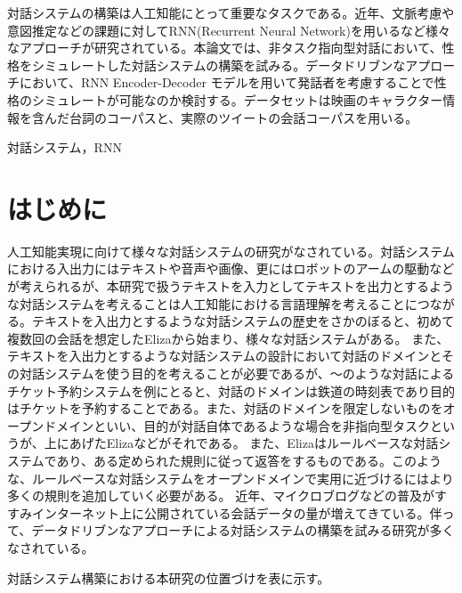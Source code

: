 \documentclass{deimj}
\begin{document}
\pagestyle{empty}
\begin{jabstract}
対話システムの構築は人工知能にとって重要なタスクである。近年、文脈考慮や意図推定などの課題に対してRNN(Recurrent Neural Network)を用いるなど様々なアプローチが研究されている。本論文では、非タスク指向型対話において、性格をシミュレートした対話システムの構築を試みる。データドリブンなアプローチにおいて、RNN Encoder-Decoder モデルを用いて発話者を考慮することで性格のシミュレートが可能なのか検討する。データセットは映画のキャラクター情報を含んだ台詞のコーパスと、実際のツイートの会話コーパスを用いる。
\end{jabstract}

\begin{jkeyword}
対話システム，RNN
\end{jkeyword}
\maketitle

\section{はじめに}
\label{sec:introduction}

人工知能実現に向けて様々な対話システムの研究がなされている。対話システムにおける入出力にはテキストや音声や画像、更にはロボットのアームの駆動などが考えられるが、本研究で扱うテキストを入力としてテキストを出力とするような対話システムを考えることは人工知能における言語理解を考えることにつながる。テキストを入出力とするような対話システムの歴史をさかのぼると、初めて複数回の会話を想定したElizaから始まり、様々な対話システムがある。%
また、テキストを入出力とするような対話システムの設計において対話のドメインとその対話システムを使う目的を考えることが必要であるが、〜のような対話によるチケット予約システムを例にとると、対話のドメインは鉄道の時刻表であり目的はチケットを予約することである。また、対話のドメインを限定しないものをオープンドメインといい、目的が対話自体であるような場合を非指向型タスクというが、上にあげたElizaなどがそれである。
また、Elizaはルールベースな対話システムであり、ある定められた規則に従って返答をするものである。このような、ルールベースな対話システムをオープンドメインで実用に近づけるにはより多くの規則を追加していく必要がある。
近年、マイクロブログなどの普及がすすみインターネット上に公開されている会話データの量が増えてきている。伴って、データドリブンなアプローチによる対話システムの構築を試みる研究が多くなされている。

対話システム構築における本研究の位置づけを表に示す。
\end{document}
